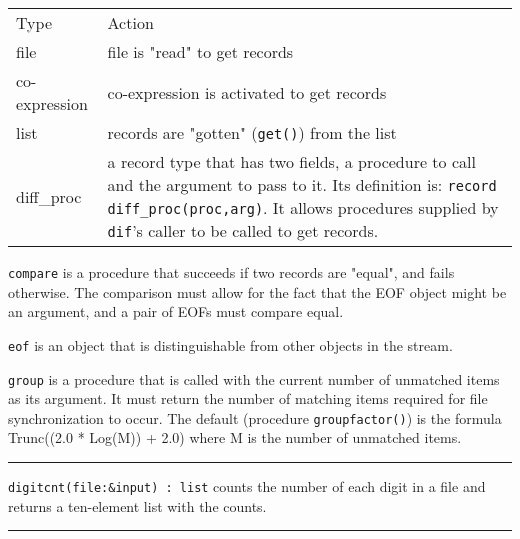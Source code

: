 \begin{xtabular}{m{1.0in} m{4.8in}}
Type & Action \\

file &  file is "read" to get records\\
co-expression & co-expression is activated to get records\\
list & records are "gotten"
(\texttt{get()}) from the list\\
diff\_proc & a record type that has two fields, a procedure
to call and the argument to pass to it. Its definition is:
 \texttt{record diff\_proc(proc,arg)}. It allows
procedures supplied by \texttt{dif}'s
 caller to be called to get records.
\\
\end{xtabular}

\texttt{compare} is a procedure that succeeds if two records are
"equal", and fails otherwise. The
comparison must allow for the fact that the EOF object might be an
argument, and a pair of EOFs must compare equal.

\texttt{eof} is an object that is distinguishable from other objects in
the stream.

\texttt{group} is a procedure that is called with the current number of
unmatched items as its argument. It must return the number of matching
items required for file synchronization to occur. The default
(procedure \texttt{groupfactor()}) is the formula Trunc((2.0 * Log(M))
+ 2.0) where M is the number of unmatched items.

\vspace{0.25cm}\hrule{}

\texttt{digitcnt(file:\&input) : list} counts the number of each digit
in a file and returns a ten-element list with the counts. 



\vspace{0.25cm}\hrule{}

